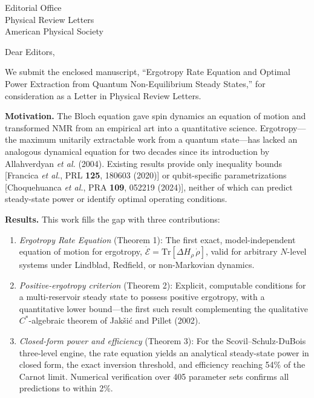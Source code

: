 \documentclass[12pt]{letter}
\begin{document}
\begin{letter}{Editorial Office\\Physical Review Letters\\American Physical Society}

\opening{Dear Editors,}

We submit the enclosed manuscript, ``Ergotropy Rate Equation and Optimal Power Extraction from Quantum Non-Equilibrium Steady States,'' for consideration as a Letter in Physical Review Letters.

\textbf{Motivation.} The Bloch equation gave spin dynamics an equation of motion and transformed NMR from an empirical art into a quantitative science. Ergotropy---the maximum unitarily extractable work from a quantum state---has lacked an analogous dynamical equation for two decades since its introduction by Allahverdyan \textit{et al.} (2004). Existing results provide only inequality bounds [Francica \textit{et al.}, PRL \textbf{125}, 180603 (2020)] or qubit-specific parametrizations [Choquehuanca \textit{et al.}, PRA \textbf{109}, 052219 (2024)], neither of which can predict steady-state power or identify optimal operating conditions.

\textbf{Results.} This work fills the gap with three contributions:

\begin{enumerate}
\item \textit{Ergotropy Rate Equation} (Theorem 1): The first exact, model-independent equation of motion for ergotropy, $\dot{\mathcal{E}} = \mathrm{Tr}[\Delta H_\rho \, \dot\rho]$, valid for arbitrary $N$-level systems under Lindblad, Redfield, or non-Markovian dynamics.

\item \textit{Positive-ergotropy criterion} (Theorem 2): Explicit, computable conditions for a multi-reservoir steady state to possess positive ergotropy, with a quantitative lower bound---the first such result complementing the qualitative $C^*$-algebraic theorem of Jak\v{s}i\'{c} and Pillet (2002).

\item \textit{Closed-form power and efficiency} (Theorem 3): For the Scovil--Schulz-DuBois three-level engine, the rate equation yields an analytical steady-state power in closed form, the exact inversion threshold, and efficiency reaching 54\% of the Carnot limit. Numerical verification over 405 parameter sets confirms all predictions to within 2\%.
\end{enumerate}


\end{letter}
\end{document}
